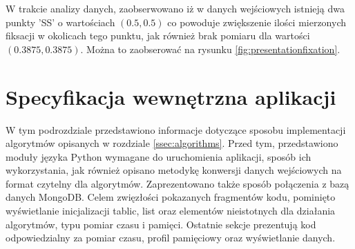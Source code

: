 W trakcie analizy danych, zaobserwowano iż w danych wejściowych istnieją dwa punkty 'SS' o wartościach $(0.5,0.5)$ co powoduje zwiększenie ilości mierzonych fiksacji w okolicach tego punktu, jak również brak pomiaru dla wartości $(0.3875,0.3875)$. Można to zaobserować na rysunku \ref{fig:presentationfixation}.
\section{Specyfikacja wewnętrzna aplikacji}
\label{sec:internal}
W tym podrozdziale przedstawiono informacje dotyczące sposobu implementacji algorytmów opisanych w rozdziale \ref{ssec:algorithms}. Przed tym, przedstawiono moduły języka Python wymagane do uruchomienia aplikacji, sposób ich wykorzystania, jak również opisano metodykę konwersji danych wejściowych na format czytelny dla algorytmów. Zaprezentowano także sposób połączenia z bazą danych MongoDB. Celem zwięzłości pokazanych fragmentów kodu, pominięto wyświetlanie inicjalizacji tablic, list oraz elementów nieistotnych dla działania algorytmów, typu pomiar czasu i pamięci. Ostatnie sekcje prezentują kod odpowiedzialny za pomiar czasu, profil pamięciowy oraz wyświetlanie danych.
